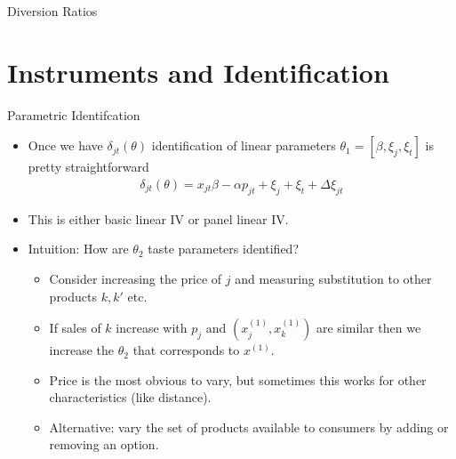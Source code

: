 \begin{frame}{Diversion Ratios}
\begin{center}
\scalebox{0.6}{

}
\end{center}
\end{frame}


\section{Instruments and Identification}

\begin{frame}{Parametric Identifcation}
\begin{itemize}
\item Once we have $\delta_{jt}(\theta)$ identification of linear parameters $\theta_1=[\beta,\xi_j, \xi_t]$ is pretty straightforward
\begin{eqnarray*}
\delta_{jt}(\theta) = x_{jt} \beta - \alpha p_{jt} + \xi_j + \xi_t + \Delta \xi_{jt}
\end{eqnarray*}
\item This is either basic linear IV or panel linear IV.
\item Intuition: How are $\theta_2$ taste parameters identified?
\begin{itemize}
\item Consider increasing the price of $j$ and measuring substitution to other products $k,k'$ etc.
\item If sales of $k$ increase with $p_j$ and $(x_j^{(1)},x_k^{(1)})$ are similar then we increase the $\theta_2$ that corresponds to $x^{(1)}$.
\item Price is the most obvious to vary, but sometimes this works for other characteristics (like distance).
\item Alternative: vary the set of products available to consumers by adding or removing an option.
\end{itemize}
\end{itemize}
\end{frame}




